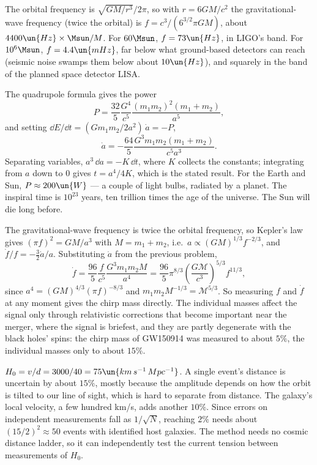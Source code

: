  The orbital frequency is $\sqrt{GM/r^3}/2\pi$, so with $r = 6GM/c^2$ the gravitational-wave frequency (twice the orbital) is $f = c^3/(6^{3/2}\pi GM)$, about $4400\un{Hz}\times\Msun/M$. For $60\Msun$, $f = 73\un{Hz}$, in LIGO's band. For $10^6\Msun$, $f = 4.4\un{mHz}$, far below what ground-based detectors can reach (seismic noise swamps them below about $10\un{Hz}$), and squarely in the band of the planned space detector LISA.

 The quadrupole formula gives the power
\[
  P = \frac{32}{5}\frac{G^4}{c^5}\frac{(m_1m_2)^2(m_1+m_2)}{a^5},
\]
and setting $\dd E/\dd t = (Gm_1m_2/2a^2)\,\dot a = -P$,
\[
  \dot a = -\frac{64}{5}\frac{G^3m_1m_2(m_1+m_2)}{c^5a^3}.
\]
Separating variables, $a^3\,\dd a = -K\,\dd t$, where $K$ collects the constants; integrating from $a$ down to $0$ gives $t = a^4/4K$, which is the stated result. For the Earth and Sun, $P\approx200\un{W}$ --- a couple of light bulbs, radiated by a planet. The inspiral time is $10^{23}$ years, ten trillion times the age of the universe. The Sun will die long before.

 The gravitational-wave frequency is twice the orbital frequency, so Kepler's law gives $(\pi f)^2 = GM/a^3$ with $M = m_1+m_2$, i.e.\ $a\propto(GM)^{1/3}f^{-2/3}$, and $\dot f/f = -\tfrac32\dot a/a$. Substituting $\dot a$ from the previous problem,
\[
  \dot f = \frac{96}{5}\frac{f}{c^5}\frac{G^3m_1m_2M}{a^4} = \frac{96}{5}\pi^{8/3}\left(\frac{G\mathcal M}{c^3}\right)^{5/3}f^{11/3},
\]
since $a^4 = (GM)^{4/3}(\pi f)^{-8/3}$ and $m_1m_2M^{-1/3} = \mathcal M^{5/3}$. So measuring $f$ and $\dot f$ at any moment gives the chirp mass directly. The individual masses affect the signal only through relativistic corrections that become important near the merger, where the signal is briefest, and they are partly degenerate with the black holes' spins: the chirp mass of GW150914 was measured to about $5\%$, the individual masses only to about $15\%$.

 $H_0 = v/d = 3000/40 = 75\un{km\,s^{-1}\,Mpc^{-1}}$. A single event's distance is uncertain by about $15\%$, mostly because the amplitude depends on how the orbit is tilted to our line of sight, which is hard to separate from distance. The galaxy's local velocity, a few hundred km/s, adds another $10\%$. Since errors on independent measurements fall as $1/\sqrt N$, reaching $2\%$ needs about $(15/2)^2\approx50$ events with identified host galaxies. The method needs no cosmic distance ladder, so it can independently test the current tension between measurements of $H_0$.
